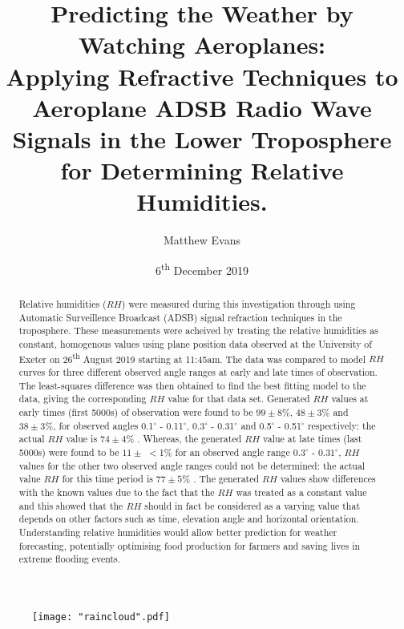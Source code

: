 \documentclass[11pt]{article}
\title{\textbf{\huge Predicting the Weather by Watching Aeroplanes: 
\\ 
\Large
Applying Refractive Techniques to Aeroplane ADSB Radio Wave Signals in the Lower Troposphere for Determining Relative Humidities.}}
\author{Matthew Evans}%
\date{6\textsuperscript{th} December 2019} %
\begin{document}
\maketitle %

\begin{figure}[h]
\centering
\texttt{[image: "raincloud".pdf]}
\label{fig:raincloud}
\end{figure}

\thispagestyle{empty}
\newpage



\vspace*{\fill}
\begin{abstract}

\noindent
Relative humidities ($RH$) were measured during this investigation through using Automatic Surveillence Broadcast (ADSB) signal refraction techniques in the troposphere. These measurements were acheived by treating the relative humidities as constant, homogenous values using plane position data observed at the University of Exeter on 26\textsuperscript{th} August 2019 starting at 11:45am. The data was compared to model $RH$ curves for three different observed angle ranges at early and late times of observation. The least-squares difference was then obtained to find the best fitting model to the data, giving the corresponding $RH$ value for that data set. Generated $RH$ values at early times (first 5000s) of observation were found to be $99 \pm 8\%$, $48 \pm 3\%$ and $38 \pm 3\%$, for observed angles 0.1$^{\circ}$ - 0.11$^{\circ}$, 0.3$^{\circ}$ - 0.31$^{\circ}$ and 0.5$^{\circ}$ - 0.51$^{\circ}$ respectively: the actual $RH$ value is $74 \pm 4\%$ \cite{Web01}. Whereas, the generated $RH$ value at late times (last 5000s) were found to be $11 \pm$ $<$1$\%$ for an observed angle range $0.3^{\circ}$ - $0.31^{\circ}$, $RH$ values for the other two observed angle ranges could not be determined: the actual value $RH$ for this time period is $77 \pm 5\%$ \cite{Web01}. The generated $RH$ values show differences with the known values due to the fact that the $RH$ was treated as a constant value and this showed that the $RH$  should in fact be considered as a varying value that depends on other factors such as time, elevation angle and horizontal orientation. Understanding relative humidities would allow better prediction for weather forecasting, potentially optimising food production for farmers and saving lives in extreme flooding events.
\thispagestyle{empty}
\end{abstract}
\vspace*{\fill}
\end{document}
